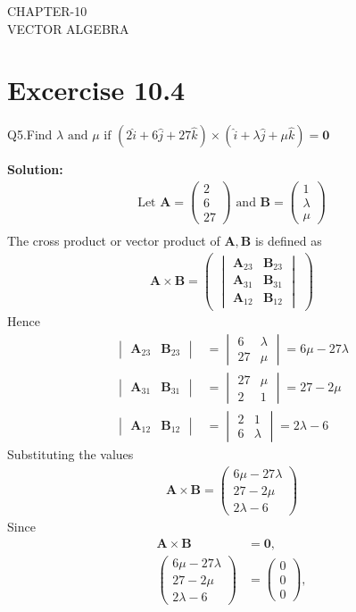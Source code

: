 \documentclass[12pt]{article}
\newcommand{\mydet}[1]{\ensuremath{\begin{vmatrix}#1\end{vmatrix}}}
\newcommand{\solution}{\noindent \textbf{Solution: }}
\newcommand{\myvec}[1]{\ensuremath{\begin{pmatrix}#1\end{pmatrix}}}
\let\vec\mathbf
\begin{document}
\begin{center}
\textbf\large{CHAPTER-10 \\ VECTOR ALGEBRA}

\end{center}
\section*{Excercise 10.4}

Q5.Find $\lambda \text{ and } \mu \text{ if } (2\hat{i}+6\hat{j}+27\hat{k}) \times (\hat{i}+\lambda \hat{j}+\mu \hat{k})=\vec{0}$

\solution
\fi
\begin{align}
	\text{Let } \vec{A} = \myvec{2\\6\\27} \text{ and } \vec{B} = \myvec{1\\ \lambda \\ \mu}\\
\end{align}
The cross product or vector product of $\vec{A},\vec{B}$ is defined as
\begin{align}
	\vec{A} \times \vec{B} = \myvec{\mydet{\vec{A}_{23}&\vec{B}_{23}\\\vec{A}_{31}&\vec{B}_{31}\\\vec{A}_{12}&\vec{B}_{12}}}
\end{align}
Hence
\begin{align}
	\mydet{\vec{A}_{23}&\vec{B}_{23}}&=\mydet{6&\lambda\\27&\mu}=6\mu-27\lambda\\
	\mydet{\vec{A}_{31}&\vec{B}_{31}}&=\mydet{27&\mu\\2&1}=27-2\mu\\
	\mydet{\vec{A}_{12}&\vec{B}_{12}}&=\mydet{2&1\\6&\lambda}=2\lambda-6
\end{align}
Substituting the values
\begin{align}
	\vec{A}\times\vec{B}=\myvec{6\mu-27\lambda\\27-2\mu\\2\lambda-6}
\end{align}
Since
\begin{align}
	\vec{A} \times \vec{B} &= \vec{0},
	\\
	\myvec{6\mu-27\lambda\\27-2\mu\\2\lambda-6}&=\myvec{0\\0\\0},
\end{align}
\end{document}
